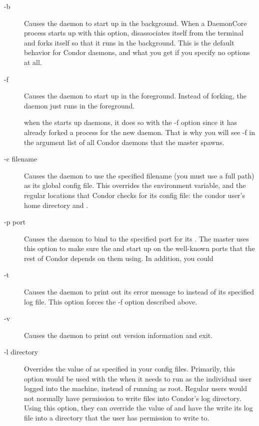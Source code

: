 \begin{description}

\item[-b] Causes the daemon to start up in the background.  When a
  DaemonCore process starts up with this option, disassociates itself
  from the terminal and forks itself so that it runs in the
  background.  This is the default behavior for Condor daemons, and
  what you get if you specify no options at all.

\item[-f] Causes the daemon to start up in the foreground.  Instead of
  forking, the daemon just runs in the foreground.  

  \Note when the  starts up daemons, it does
  so with the -f option since it has already forked a process for the
  new daemon.  That is why you will see -f in the argument list of all
  Condor daemons that the master spawns.

\item[-c filename] Causes the daemon to use the specified filename
  (you must use a full path) as its global config file.  This
  overrides the  environment variable, and the
  regular locations that Condor checks for its config file: the condor
  user's home directory and .  

\item[-p port] Causes the daemon to bind to the specified port for its
  .  The master uses this option to make sure the
   and  start up on the
  well-known ports that the rest of Condor depends on them using.  In
  addition, you could

\item[-t] Causes the daemon to print out its error message to
   instead of its specified log file.  This option forces
  the -f option described above.

\item[-v] Causes the daemon to print out version information and
  exit.

\item[-l directory] Overrides the value of  as specified in
  your config files.  Primarily, this option would be used with the
   when it needs to run as the individual user logged
  into the machine, instead of running as root.  Regular users would
  not normally have permission to write files into Condor's log
  directory.  Using this option, they can override the value of
   and have the  write its log file into a
  directory that the user has permission to write to.


\end{description}
